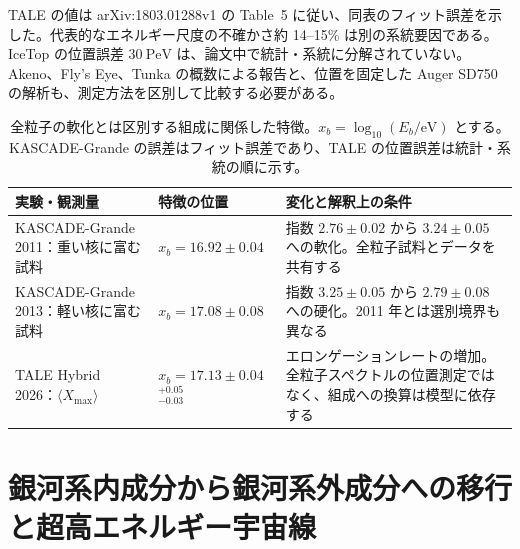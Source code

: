 \documentclass[book,paper=a4,fontsize=11pt]{jlreq}
\begin{document}
TALE の値は arXiv:1803.01288v1 の Table~5 に従い、同表のフィット誤差を示した。代表的なエネルギー尺度の不確かさ約 14--15\% は別の系統要因である。IceTop の位置誤差 \(30\ \mathrm{PeV}\) は、論文中で統計・系統に分解されていない。Akeno、Fly's Eye、Tunka の概数による報告と、位置を固定した Auger SD750 の解析も、測定方法を区別して比較する必要がある。

\begin{table}[!htbp]
  \centering
  \small
  \caption{全粒子の軟化とは区別する組成に関係した特徴。\(x_b=\log_{10}(E_b/\mathrm{eV})\) とする。KASCADE-Grande の誤差はフィット誤差であり、TALE の位置誤差は統計・系統の順に示す。}
  \label{tab:composition_features}
  \renewcommand{\arraystretch}{1.45}
  \begin{tabular}{@{}p{0.27\hsize}p{0.26\hsize}p{0.39\hsize}@{}}
    \hline
    実験・観測量 & 特徴の位置 & 変化と解釈上の条件 \\
    \hline
    \raggedright KASCADE-Grande 2011：重い核に富む試料~\cite{KASCADEGrandeHeavyKnee2011} & \raggedright \(x_b=16.92\pm0.04\) & \raggedright 指数 \(2.76\pm0.02\) から \(3.24\pm0.05\) への軟化。全粒子試料とデータを共有する \tabularnewline
    \raggedright KASCADE-Grande 2013：軽い核に富む試料~\cite{KASCADEGrandeLightAnkle2013} & \raggedright \(x_b=17.08\pm0.08\) & \raggedright 指数 \(3.25\pm0.05\) から \(2.79\pm0.08\) への硬化。2011 年とは選別境界も異なる \tabularnewline
    \raggedright TALE Hybrid 2026：\(\langle X_{\max}\rangle\)~\cite{TALEMassComposition2026} & \raggedright \(x_b=17.13\pm0.04\) \({}^{+0.05}_{-0.03}\) & \raggedright エロンゲーションレートの増加。全粒子スペクトルの位置測定ではなく、組成への換算は模型に依存する \tabularnewline
    \hline
  \end{tabular}
\end{table}
\FloatBarrier

\section{銀河系内成分から銀河系外成分への移行と超高エネルギー宇宙線}
\end{document}
